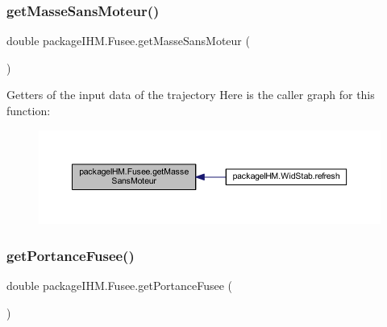 \subsubsection{\texorpdfstring{get\+Masse\+Sans\+Moteur()}{getMasseSansMoteur()}}
{\footnotesize\ttfamily double package\+I\+H\+M.\+Fusee.\+get\+Masse\+Sans\+Moteur (\begin{DoxyParamCaption}{ }\end{DoxyParamCaption})}

Getters of the input data of the trajectory Here is the caller graph for this function\+:
\nopagebreak
\begin{figure}[H]
\begin{center}
\leavevmode
\includegraphics[width=350pt]{classpackage_i_h_m_1_1_fusee_a041b9744320e9542be57dc3213090695_icgraph}
\end{center}
\end{figure}
\mbox{\label{classpackage_i_h_m_1_1_fusee_afc0492c0c663001bd7a0369842e988ba}} 
\subsubsection{\texorpdfstring{get\+Portance\+Fusee()}{getPortanceFusee()}}
{\footnotesize\ttfamily double package\+I\+H\+M.\+Fusee.\+get\+Portance\+Fusee (\begin{DoxyParamCaption}{ }\end{DoxyParamCaption})}

